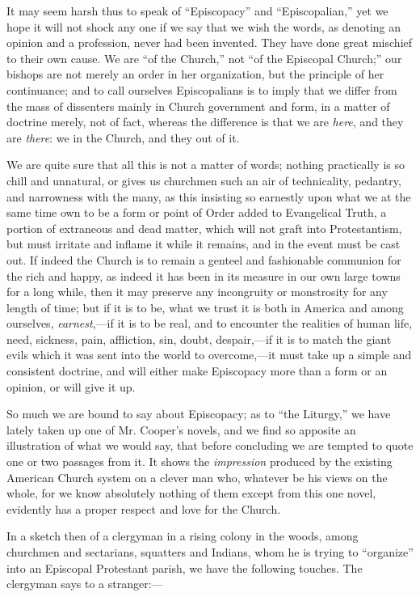 It may seem harsh thus to speak of ``Episcopacy''
and ``Episcopalian,'' yet we hope it will not shock any one if we say
that we wish the words, as denoting an opinion and a profession, never
had been invented. They have done great mischief to their own cause.
We are ``of the Church,'' not ``of the Episcopal Church;'' our bishops are
not merely an order in her organization, but the principle of her
continuance; and to call ourselves Episcopalians is to imply that we
differ from the mass of dissenters mainly in Church government and
form, in a matter of doctrine merely, not of fact, whereas the
difference is that we are \emph{here}, and they are \emph{there}: we
in the Church, and they out of it.

We are quite sure that all this is not a matter
of words; nothing practically is so chill and unnatural, or gives us churchmen such an air of technicality, pedantry, and
narrowness with the many, as this insisting so earnestly upon what we
at the same time own to be a form or point of Order added to
Evangelical Truth, a portion of extraneous and dead matter, which will
not graft into Protestantism, but must irritate and inflame it while
it remains, and in the event must be cast out. If indeed the Church is
to remain a genteel and fashionable communion for the rich and happy,
as indeed it has been in its measure in our own large towns for a long
while, then it may preserve any incongruity or monstrosity for any
length of time; but if it is to be, what we trust it is both in
America and among ourselves, \emph{earnest},—if it is to be real,
and to encounter the realities of human life, need, sickness, pain,
affliction, sin, doubt, despair,—if it is to match the giant evils
which it was sent into the world to overcome,—it must take up a
simple and consistent doctrine, and will either make Episcopacy more
than a form or an opinion, or will give it up.

So much we are bound to say about Episcopacy; as
to ``the Liturgy,'' we have lately taken up one of Mr. Cooper's novels,
and we find so apposite an illustration of what we would say, that
before concluding we are tempted to quote one or two passages from it.
It shows the \emph{impression} produced by the existing American
Church system on a clever man who, whatever be his views on the whole,
for we know absolutely nothing of them except from this one novel,
evidently has a proper respect and love for the Church.

In a sketch then of a clergyman in a rising
colony in the woods, among churchmen and sectarians, squatters and
Indians, whom he is trying to ``organize'' into an Episcopal Protestant
parish, we have the following touches. The clergyman says to a
stranger:—

